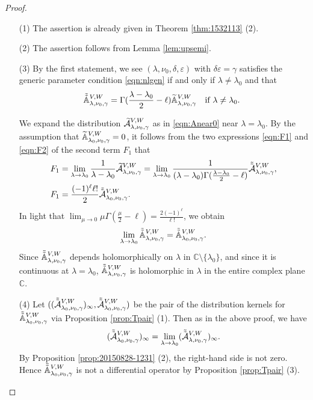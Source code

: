 \begin{proof}
\begin{enumerate}
\item[(1)]
The assertion is already given in Theorem \ref{thm:1532113} (2).  
\item[(2)]
The assertion follows from Lemma \ref{lem:upsemi}.  
\item[(3)]
By the first statement,
 we see $(\lambda, \nu_0,\delta, \varepsilon)$ 
 with $\delta \varepsilon =\gamma$ satisfies the generic parameter condition 
\eqref{eqn:nlgen}
 if and only if $\lambda \ne \lambda_0$ and that
\[
  \tilde{\tilde{{\mathbb{A}}}}_{{\lambda},{\nu_0},{\gamma}}^{{V,W}}
  =
  \Gamma(\frac {\lambda-\lambda_0}2 -\ell)
  {\widetilde{\mathbb{A}}}_{{\lambda},{\nu_0},{\gamma}}^{{V,W}}
\quad
  \text{if $\lambda \ne \lambda_0$.  }
\]



We expand the distribution 
$
   \widetilde{{\mathcal{A}}}_{{\lambda},{\nu_0},{\gamma}}^{{V,W}}
$
 as in \eqref{eqn:Anear0} near $\lambda=\lambda_0$.  
By the assumption 
 that ${\widetilde{\mathbb{A}}}_{{\lambda_0},{\nu_0},{\gamma}}^{{V,W}}=0$,
 it follows from the two expressions \eqref{eqn:F1} and \eqref{eqn:F2}
 of the second term $F_1$
 that  
\begin{align*}
  F_1 &= \lim_{\lambda \to \lambda_0} \frac 1 {\lambda-\lambda_0}
        \widetilde{{\mathcal{A}}}_{{\lambda},{\nu_0},{\gamma}}^{{V,W}}
      =\lim_{\lambda \to \lambda_0} \frac 1 {(\lambda-\lambda_0)
                                          \Gamma(\frac {\lambda-\lambda_0} 2-\ell)}
        \tilde{\tilde{{\mathcal{A}}}}_{{\lambda},{\nu_0},{\gamma}}^{{V,W}}, 
\\
 F_1 &= \frac {(-1)^\ell \ell!}{2}
        \tilde{\tilde{{\mathcal{A}}}}_{{\lambda_0},{\nu_0},{\gamma}}^{{V,W}}.  
\end{align*}
In light that $\lim_{\mu \to 0} \mu \Gamma (\frac {\mu}2- \ell)
 = \frac {2(-1)^\ell}{\ell !}$, 
 we obtain
\[
   \lim_{\lambda \to \lambda_0}\tilde{\tilde{{\mathbb{A}}}}_{{\lambda},{\nu_0},{\gamma}}^{{V,W}}
   =
   \tilde{\tilde{{\mathbb{A}}}}_{{\lambda_0},{\nu_0},{\gamma}}^{{V,W}}.  
\]
Since $\tilde{\tilde{{\mathbb{A}}}}_{{\lambda},{\nu_0},{\gamma}}^{{V,W}}$ depends holomorphically
 on $\lambda$ in ${\mathbb{C}}\setminus \{\lambda_0\}$, 
 and since it is continuous at $\lambda=\lambda_0$, 
 $\tilde{\tilde{{\mathbb{A}}}}_{{\lambda},{\nu_0},{\gamma}}^{{V,W}}$ is holomorphic in $\lambda$ 
 in the entire complex plane ${\mathbb{C}}$.  
\item[(4)]
Let $( (\tilde{\tilde{{\mathcal{A}}}}_{{\lambda_0},{\nu_0},{\gamma}}^{{V,W}})_{\infty}, \tilde{\tilde{{\mathcal{A}}}}_{{\lambda_0},{\nu_0},{\gamma}}^{{V,W}})$ be the pair
 of the distribution kernels 
 for $\tilde{\tilde{{\mathbb{A}}}}_{{\lambda_0},{\nu_0},{\gamma}}^{{V,W}}$
 via Proposition \ref{prop:Tpair} (1).  
Then as in the above proof, 
 we have
\[
   (\tilde{\tilde{{\mathcal{A}}}}_{{\lambda_0},{\nu_0},{\gamma}}^{{V,W}})_{\infty}
   =
    \lim_{\lambda \to \lambda_0}
    (\tilde{\tilde{{\mathcal{A}}}}_{{\lambda},{\nu_0},{\gamma}}^{{V,W}})_{\infty}.  
\]
By Proposition \ref{prop:20150828-1231} (2), 
 the right-hand side is not zero.  
Hence $\tilde{\tilde{{\mathbb{A}}}}_{{\lambda_0},{\nu_0},{\gamma}}^{{V,W}}$ is not 
 a differential operator
 by Proposition \ref{prop:Tpair} (3).  
\end{enumerate}
\end{proof}



